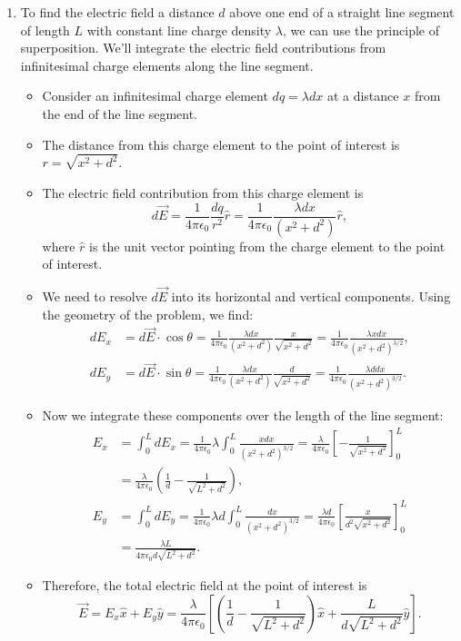 \documentclass{article}
\begin{document}
\begin{enumerate}
\item To find the electric field a distance \(d\) above one end of a straight line segment of length \(L\) with constant line charge density \(\lambda\), we can use the principle of superposition. We'll integrate the electric field contributions from infinitesimal charge elements along the line segment.

\begin{itemize}
\item Consider an infinitesimal charge element \(dq = \lambda dx\) at a distance \(x\) from the end of the line segment.
\item The distance from this charge element to the point of interest is \(r = \sqrt{x^2 + d^2}\).
\item The electric field contribution from this charge element is 
\begin{equation*}
d\vec{E} = \frac{1}{4\pi\epsilon_0} \frac{dq}{r^2} \hat{r} = \frac{1}{4\pi\epsilon_0} \frac{\lambda dx}{(x^2 + d^2)} \hat{r},
\end{equation*}
where \(\hat{r}\) is the unit vector pointing from the charge element to the point of interest.
\item We need to resolve \(d\vec{E}\) into its horizontal and vertical components. Using the geometry of the problem, we find:
\begin{align*}
dE_x &= d\vec{E} \cdot \cos\theta = \frac{1}{4\pi\epsilon_0} \frac{\lambda dx}{(x^2 + d^2)} \frac{x}{\sqrt{x^2 + d^2}} = \frac{1}{4\pi\epsilon_0} \frac{\lambda x dx}{(x^2 + d^2)^{3/2}}, \\
dE_y &= d\vec{E} \cdot \sin\theta = \frac{1}{4\pi\epsilon_0} \frac{\lambda dx}{(x^2 + d^2)} \frac{d}{\sqrt{x^2 + d^2}} = \frac{1}{4\pi\epsilon_0} \frac{\lambda d dx}{(x^2 + d^2)^{3/2}}.
\end{align*}
\item Now we integrate these components over the length of the line segment:
\begin{align*}
E_x &= \int_0^L dE_x = \frac{1}{4\pi\epsilon_0} \lambda \int_0^L \frac{x dx}{(x^2 + d^2)^{3/2}} = \frac{\lambda}{4\pi\epsilon_0} \left[ -\frac{1}{\sqrt{x^2 + d^2}} \right]_0^L \\
&= \frac{\lambda}{4\pi\epsilon_0} \left( \frac{1}{d} - \frac{1}{\sqrt{L^2 + d^2}} \right), \\
E_y &= \int_0^L dE_y = \frac{1}{4\pi\epsilon_0} \lambda d \int_0^L \frac{dx}{(x^2 + d^2)^{3/2}} = \frac{\lambda d}{4\pi\epsilon_0} \left[ \frac{x}{d^2 \sqrt{x^2 + d^2}} \right]_0^L \\
&= \frac{\lambda L}{4\pi\epsilon_0 d \sqrt{L^2 + d^2}}.
\end{align*}
\item Therefore, the total electric field at the point of interest is
\begin{equation*}
\vec{E} = E_x \hat{x} + E_y \hat{y} = \frac{\lambda}{4\pi\epsilon_0} \left[ \left( \frac{1}{d} - \frac{1}{\sqrt{L^2 + d^2}} \right) \hat{x} + \frac{L}{d \sqrt{L^2 + d^2}} \hat{y} \right].
\end{equation*}
\end{itemize}


\end{enumerate}
\end{document}

